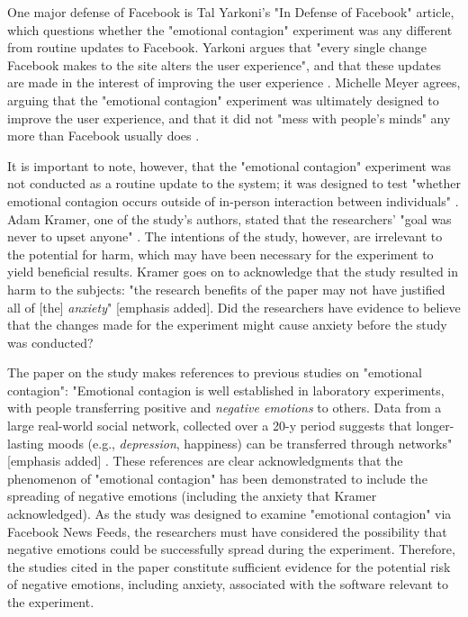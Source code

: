 	One major defense of Facebook is Tal Yarkoni's "In Defense of Facebook" article, which questions whether the "emotional contagion" experiment was any different from routine updates to Facebook.  Yarkoni argues that "every single change Facebook makes to the site alters the user experience", and that these updates are made in the interest of improving the user experience \cite{defense}.  Michelle Meyer agrees, arguing that the "emotional contagion" experiment was ultimately designed to improve the user experience, and that it did not "mess with people's minds" any more than Facebook usually does \cite{misjudgements}.  \par
	It is important to note, however, that the "emotional contagion" experiment was not conducted as a routine update to the system; it was designed to test "whether emotional contagion occurs outside of in-person interaction between individuals" \cite{study}.  Adam Kramer, one of the study's authors, stated that the researchers' "goal was never to upset anyone" \cite{atlantic}.  The intentions of the study, however, are irrelevant to the potential for harm, which may have been necessary for the experiment to yield beneficial results.  Kramer goes on to acknowledge that the study resulted in harm to the subjects: "the research benefits of the paper may not have justified all of [the] \textit{anxiety}" [emphasis added].  Did the researchers have evidence to believe that the changes made for the experiment might cause anxiety before the study was conducted? \par
	The paper on the study makes references to previous studies on "emotional contagion": "Emotional contagion is well established in laboratory experiments, with people transferring positive and \textit{negative emotions} to others.  Data from a large real-world social network, collected over a 20-y period suggests that longer-lasting moods (e.g., \textit{depression}, happiness) can be transferred through networks" [emphasis added] \cite{study}.  These references are clear acknowledgments that the phenomenon of "emotional contagion" has been demonstrated to include the spreading of negative emotions (including the anxiety that Kramer acknowledged).  As the study was designed to examine "emotional contagion" via Facebook News Feeds, the researchers must have considered the possibility that negative emotions could be successfully spread during the experiment.  Therefore, the studies cited in the paper constitute sufficient evidence for the potential risk of negative emotions, including anxiety, associated with the software relevant to the experiment. \par

